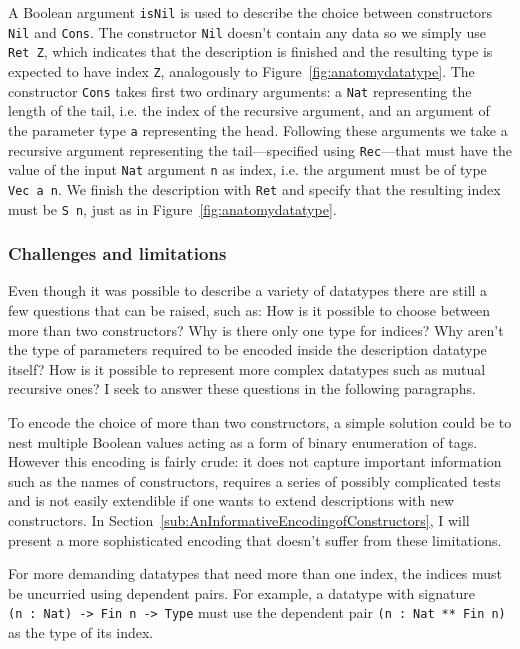 \documentclass{ituthesis}
\newcommand{\ttconstructor}[1]{\textcolor{constructor-color}{\texttt{#1}}}
\newcommand{\tttype}[1]{\textcolor{type-color}{\texttt{#1}}}
\newcommand{\ttvar}[1]{\textcolor{local-var-color}{\texttt{#1}}}
\theoremstyle{break}
\begin{document}
A Boolean argument \ttvar{isNil} is used to describe the choice between constructors \ttconstructor{Nil} and \ttconstructor{Cons}.
The constructor \ttconstructor{Nil} doesn't contain any data so we simply use \ttconstructor{Ret~Z}, which indicates that the description is finished and the resulting type is expected to have index \ttconstructor{Z}, analogously to Figure~\ref{fig:anatomydatatype}.
The constructor \ttconstructor{Cons} takes first two ordinary arguments: a \tttype{Nat} representing the length of the tail, i.e. the index of the recursive argument, and an argument of the parameter type \ttvar{a} representing the head.
Following these arguments we take a recursive argument representing the tail---specified using \ttconstructor{Rec}---that must have the value of the input \tttype{Nat} argument \ttvar{n} as index, i.e. the argument must be of type \tttype{Vec}~\ttvar{a~n}.
We finish the description with \ttconstructor{Ret} and specify that the resulting index must be \ttconstructor{S}~\ttvar{n}, just as in Figure~\ref{fig:anatomydatatype}.

\subsubsection{Challenges and limitations}
Even though it was possible to describe a variety of datatypes there are still a few questions that can be raised, such as: How is it possible to choose between more than two constructors? Why is there only one type for indices?
Why aren't the type of parameters required to be encoded inside the description datatype itself? How is it possible to represent more complex datatypes such as mutual recursive ones? I seek to answer these questions in the following paragraphs.

To encode the choice of more than two constructors, a simple solution could be to nest multiple Boolean values acting as a form of binary enumeration of tags.
However this encoding is fairly crude: it does not capture important information such as the names of constructors, requires a series of possibly complicated tests and is not easily extendible if one wants to extend descriptions
with new constructors. In Section~\ref{sub:AnInformativeEncodingofConstructors}, I will present a more sophisticated encoding that doesn't suffer from these limitations.

For more demanding datatypes that need more than one index, the indices must be uncurried using dependent pairs.
For example, a datatype with signature \texttt{(}\ttvar{n}~\texttt{:}~\tttype{Nat}\texttt{)~->~}\tttype{Fin}~\ttvar{n}~\texttt{->}~\tttype{Type} must use the dependent pair \tttype{(}\ttvar{n}~\texttt{:}~\tttype{Nat}~\tttype{**}~\tttype{Fin}~\ttvar{n}\tttype{)} as the type of its index.
\end{document}
